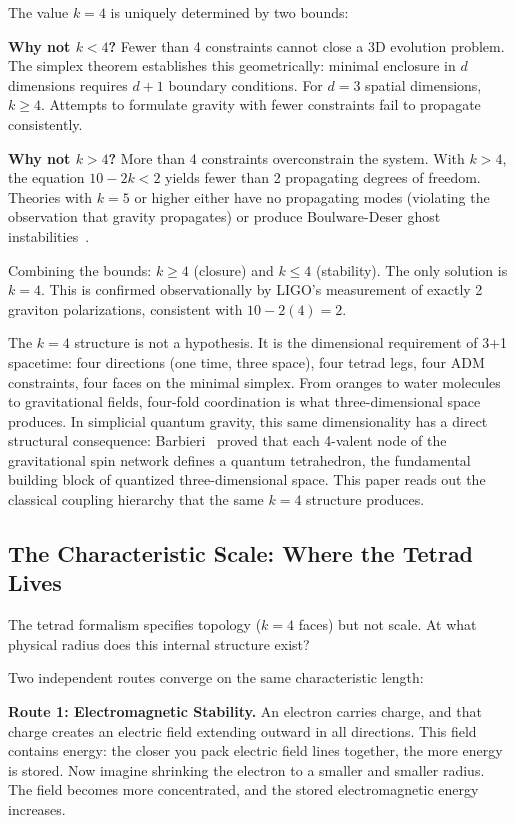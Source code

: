 \documentclass[aps,prd,preprint,superscriptaddress,showpacs,preprintnumbers,amsmath,amssymb,nofootinbib]{revtex4-2}
\begin{document}
The value $k = 4$ is uniquely determined by two bounds:

\textbf{Why not $k < 4$?} Fewer than 4 constraints cannot close a 3D evolution problem. The simplex theorem establishes this geometrically: minimal enclosure in $d$ dimensions requires $d+1$ boundary conditions. For $d = 3$ spatial dimensions, $k \geq 4$. Attempts to formulate gravity with fewer constraints fail to propagate consistently.

\textbf{Why not $k > 4$?} More than 4 constraints overconstrain the system. With $k > 4$, the equation $10 - 2k < 2$ yields fewer than 2 propagating degrees of freedom. Theories with $k = 5$ or higher either have no propagating modes (violating the observation that gravity propagates) or produce Boulware-Deser ghost instabilities~\cite{boulware1972}.

Combining the bounds: $k \geq 4$ (closure) and $k \leq 4$ (stability). The only solution is $k = 4$. This is confirmed observationally by LIGO's measurement of exactly 2 graviton polarizations, consistent with $10 - 2(4) = 2$.

The $k = 4$ structure is not a hypothesis. It is the dimensional requirement of 3+1 spacetime: four directions (one time, three space), four tetrad legs, four ADM constraints, four faces on the minimal simplex. From oranges to water molecules to gravitational fields, four-fold coordination is what three-dimensional space produces. In simplicial quantum gravity, this same dimensionality has a direct structural consequence: Barbieri~\cite{barbieri1998} proved that each 4-valent node of the gravitational spin network defines a quantum tetrahedron, the fundamental building block of quantized three-dimensional space. This paper reads out the classical coupling hierarchy that the same $k = 4$ structure produces.

\subsection{The Characteristic Scale: Where the Tetrad Lives}
\label{subsec:scale}

The tetrad formalism specifies topology ($k = 4$ faces) but not scale. At what physical radius does this internal structure exist?

Two independent routes converge on the same characteristic length:

\textbf{Route 1: Electromagnetic Stability.} An electron carries charge, and that charge creates an electric field extending outward in all directions. This field contains energy: the closer you pack electric field lines together, the more energy is stored. Now imagine shrinking the electron to a smaller and smaller radius. The field becomes more concentrated, and the stored electromagnetic energy increases.
\end{document}
